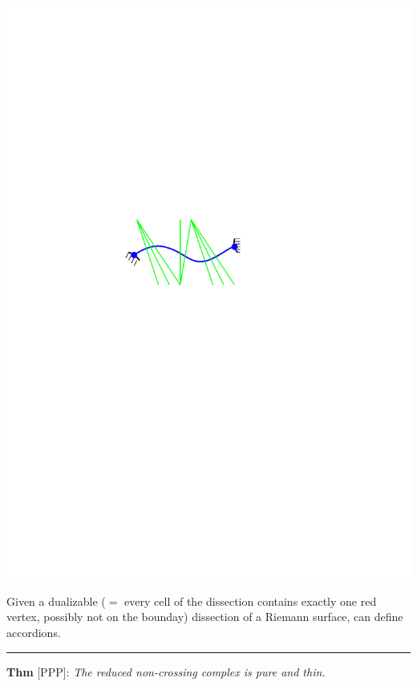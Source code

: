 \documentclass[portrait,final,a0paper,fontscale=0.25]{baposter}
\theoremstyle{definition}
\begin{document}
\begin{poster}
{\hspace*{6.8cm}\includegraphics[scale=.5]{Accordion}

\vspace*{-1.7cm}
\begin{minipage}{6.7cm}
 Given a dualizable ($=$ every cell of the dissection contains exactly one red vertex, possibly not on the bounday) dissection of a Riemann surface, can define accordions.
\end{minipage}


\vspace{.1cm}
\hspace{-.25cm}
{\color{blue} \rule{10.02cm}{1pt}}
\vspace{-.35cm}


{\color{blue} \bf Thm} [PPP]: {\it The reduced non-crossing complex is pure and thin.}

}


\end{poster}
\end{document}
